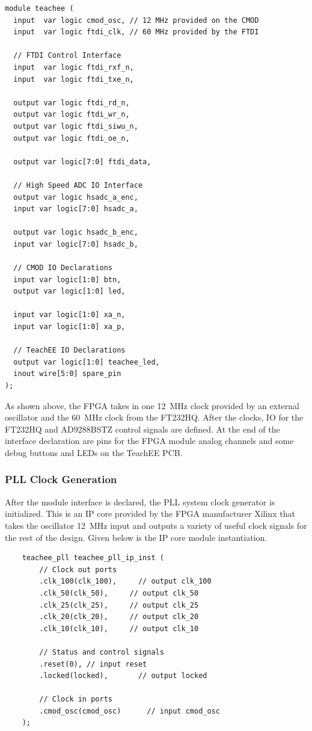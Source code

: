\documentclass[letterpaper,11pt]{article}
\begin{document}
\begin{verbatim}
module teachee (
  input  var logic cmod_osc, // 12 MHz provided on the CMOD
  input  var logic ftdi_clk, // 60 MHz provided by the FTDI

  // FTDI Control Interface
  input  var logic ftdi_rxf_n,
  input  var logic ftdi_txe_n,

  output var logic ftdi_rd_n,
  output var logic ftdi_wr_n,
  output var logic ftdi_siwu_n,
  output var logic ftdi_oe_n,

  output var logic[7:0] ftdi_data,

  // High Speed ADC IO Interface
  output var logic hsadc_a_enc,
  input var logic[7:0] hsadc_a,

  output var logic hsadc_b_enc,
  input var logic[7:0] hsadc_b,

  // CMOD IO Declarations
  input var logic[1:0] btn,
  output var logic[1:0] led,

  input var logic[1:0] xa_n,
  input var logic[1:0] xa_p,

  // TeachEE IO Declarations
  output var logic[1:0] teachee_led,
  inout wire[5:0] spare_pin
);
\end{verbatim}

As shown above, the FPGA takes in one \SI{12}{\mega\hertz} clock provided by an
external oscillator and the \SI{60}{\mega\hertz} clock from the FT232HQ. After
the clocks, IO for the FT232HQ and AD9288BSTZ control signals are defined. At
the end of the interface declaration are pins for the FPGA module analog
channels and some debug buttons and LEDs on the TeachEE PCB.

\subsubsection{PLL Clock Generation}
After the module interface is declared, the PLL system clock generator is
initialized. This is an IP core provided by the FPGA manufacturer Xilinx that
takes the oscillator \SI{12}{\mega\hertz} input and outputs a variety of useful
clock signals for the rest of the design. Given below is the IP core module
instantiation.

\begin{verbatim}
    teachee_pll teachee_pll_ip_inst (
        // Clock out ports
        .clk_100(clk_100),     // output clk_100
        .clk_50(clk_50),     // output clk_50
        .clk_25(clk_25),     // output clk_25
        .clk_20(clk_20),     // output clk_20
        .clk_10(clk_10),     // output clk_10

        // Status and control signals
        .reset(0), // input reset
        .locked(locked),       // output locked

        // Clock in ports
        .cmod_osc(cmod_osc)      // input cmod_osc
    );
\end{verbatim}
\end{document}
